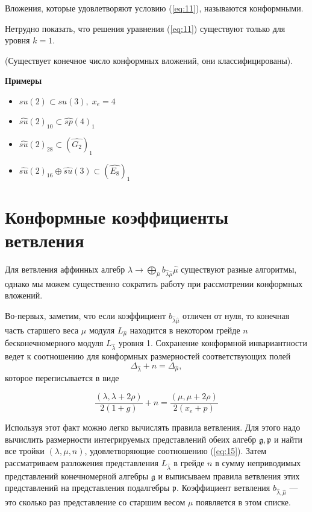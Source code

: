 \documentclass[a4paper,12pt]{article}
\theoremstyle{definition} \newtheorem{Def}{Definition}
\begin{document}
Вложения, которые удовлетворяют условию (\ref{eq:11}), называются конформными.

Нетрудно показать, что решения уравнения (\ref{eq:11}) существуют только для уровня $k=1$.

(Существует конечное число конформных вложений, они классифицированы).

{\bf Примеры}
\begin{itemize}
\item $su(2)\subset su(3),\; x_e=4$
\item $\hat{su}(2)_{10}\subset\hat{sp}(4)_1$
\item $\hat{su}(2)_{28}\subset(\hat{G_2})_1$
\item $\hat{su}(2)_{16}\oplus\hat{su}(3)\subset (\hat{E_8})_1$
\end{itemize}

\section{Конформные коэффициенты ветвления}
\label{sec:conformal-branching-rules}

Для ветвления аффинных алгебр $\hat{\lambda}\to \bigoplus_{\hat{\mu}}b_{\hat{\lambda}\hat{\mu}}\hat{\mu}$ существуют разные алгоритмы, однако мы можем существенно сократить работу при рассмотрении конформных вложений.

Во-первых, заметим, что если коэффициент $b_{\hat\lambda\hat\mu}$ отличен от нуля, то конечная часть старшего веса $\mu$ модуля $L_{\hat\mu}$ находится в некотором грейде $n$  бесконечномерного модуля $L_{\hat\lambda}$ уровня 1. Сохранение конформной инвариантности ведет к соотношению для конформных размерностей соответствующих полей
\begin{equation}
  \label{eq:14}
  \Delta_{\hat\lambda}+n=\Delta_{\hat\mu},
\end{equation}
которое переписывается в виде

\begin{equation}
  \label{eq:15}
  \frac{(\lambda,\lambda+2\rho)}{2(1+g)}+n=\frac{(\mu,\mu+2\rho)}{2(x_e+p)}
\end{equation}

Используя этот факт можно  легко вычислять правила ветвления. Для этого надо вычислить размерности интегрируемых представлений обеих алгебр  $\mathfrak{g},\mathfrak{p}$ и найти все тройки  $(\lambda,\mu,n)$, удовлетворяющие соотношению (\ref{eq:15}). Затем рассматриваем разложения представления $L_{\hat\lambda}$ в грейде $n$ в сумму неприводимых представлений конечномерной алгебры $\mathfrak{g}$ и выписываем правила ветвления этих представлений на представления подалгебры $\mathfrak{p}$. Коэффициент ветвления $b_{\hat{\lambda},\hat{\mu}}$ --- это сколько раз представление со старшим весом $\mu$ появляется в этом списке.
\end{document}
